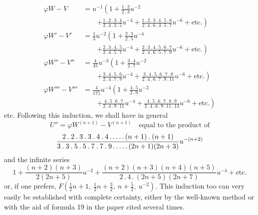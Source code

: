 \[
\begin{aligned}
\varphi W-V&=u^{-1}\left(1+\frac{1\mathbin{.}2}{2\mathbin{.}3}u^{-2}\right.\\[3pt]&\qquad\left.+\frac{1\mathbin{.}2\mathbin{.}3\mathbin{.}4}{2\mathbin{.}4\mathbin{.}3\mathbin{.}5}u^{-4}+\frac{1\mathbin{.}2\mathbin{.}3\mathbin{.}4\mathbin{.}5\mathbin{.}6}{2\mathbin{.}4\mathbin{.}6\mathbin{.}3\mathbin{.}5\mathbin{.}7}u^{-6}+\text{etc.}\right)\\[4pt]
\varphi W'-V'&=\tfrac13u^{-2}\left(1+\frac{2\mathbin{.}3}{2\mathbin{.}5}u^{-4}\right.\\[3pt]&\qquad\left.+\frac{2\mathbin{.}3\mathbin{.}4\mathbin{.}5}{2\mathbin{.}4\mathbin{.}5\mathbin{.}7}u^{-4}+\frac{2\mathbin{.}3\mathbin{.}4\mathbin{.}5\mathbin{.}6\mathbin{.}7}{2\mathbin{.}4\mathbin{.}6\mathbin{.}5\mathbin{.}7\mathbin{.}9}u^{-6}+\text{etc.}\right)\\[4pt]
\varphi W''-V''&=\tfrac4{45}u^{-3}\left(1+\frac{3\mathbin{.}4}{2\mathbin{.}7}u^{-2}\right.\\[3pt]&\qquad\left.+\frac{3\mathbin{.}4\mathbin{.}5\mathbin{.}6}{2\mathbin{.}4\mathbin{.}7\mathbin{.}9}u^{-4}+\frac{3\mathbin{.}4\mathbin{.}5\mathbin{.}6\mathbin{.}7\mathbin{.}8}{2\mathbin{.}4\mathbin{.}6\mathbin{.}7\mathbin{.}9\mathbin{.}11}u^{-6}+\text{etc.}\right)\\[4pt]
\varphi W'''-V'''&=\tfrac4{175}u^{-4}\left(1+\frac{4\mathbin{.}5}{2\mathbin{.}9}u^{-2}\right.\\[3pt]&\qquad\left.+\frac{4\mathbin{.}5\mathbin{.}6\mathbin{.}7}{2\mathbin{.}4\mathbin{.}9\mathbin{.}11}u^{-4}+\frac{4\mathbin{.}5\mathbin{.}6\mathbin{.}7\mathbin{.}8\mathbin{.}9}{2\mathbin{.}4\mathbin{.}6\mathbin{.}9\mathbin{.}11\mathbin{.}13}u^{-6}+\text{etc.}\right)
\end{aligned}
\]
etc. Following this induction, we shall have in general
\[
U''=\varphi W^{(n+1)}-V^{(n+1)}\quad\text{equal to the product of}
\]
\[
\frac{2\mathbin{.}2\mathbin{.}3\mathbin{.}3\mathbin{.}4\mathbin{.}4\mathinner{.\,.\,.\,.\,.}(n+1)\mathbin{.}(n+1)}{3\mathbin{.}3\mathbin{.}5\mathbin{.}5\mathbin{.}7\mathbin{.}7\mathbin{.}9\mathinner{.\,.\,.\,.\,.}(2n+1)(2n+3)}u^{-(n+2)}
\]
and the infinite series
\[
1+\frac{(n+2)(n+3)}{2(2n+5)}u^{-2}+\frac{(n+2)(n+3)(n+4)(n+5)}{2\mathbin{.}4\mathbin{.}(2n+5)(2n+7)}u^{-4}+\text{etc.}
\]
or, if one prefers, $F(\frac12n+1,\ \frac12n+\frac32,\ n+\frac52,\ u^{-2})$. This induction too can very easily be established with complete certainty, either by the well-known method or with the aid of formula 19 in the paper cited several times.

